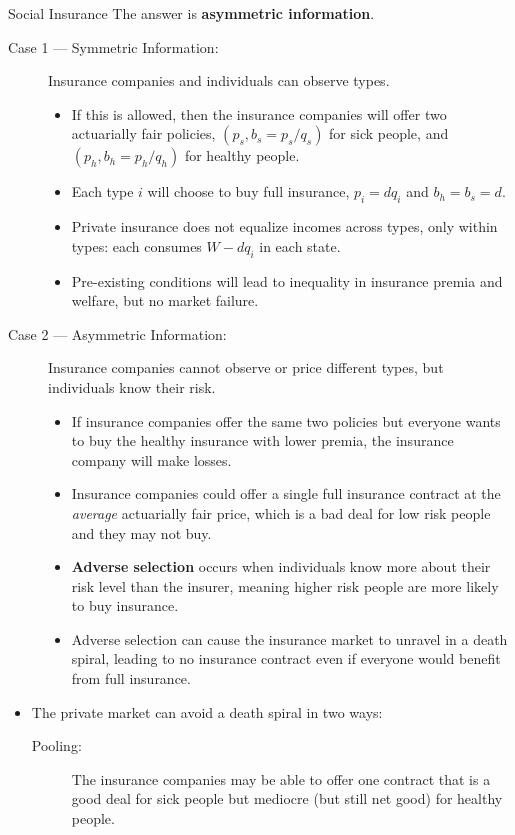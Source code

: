 \documentclass[10pt]{extarticle}
\begin{document}
\begin{problem}{Social Insurance}
    The answer is \textbf{asymmetric information}.
    \begin{description}
      \item[Case 1 --- Symmetric Information:] Insurance companies and individuals can observe types.
        \begin{itemize}
          \item If this is allowed, then the insurance companies will offer two actuarially fair policies, $(p_s, b_s = p_s/q_s)$ for sick people, and $(p_h, b_h = p_h/q_h)$ for healthy people.
          \item Each type $i$ will choose to buy full insurance, $p_i = dq_i$ and $b_h = b_s = d$.
          \item Private insurance does not equalize incomes across types, only within types: each consumes $W - dq_i$ in each state.
          \item Pre-existing conditions will lead to inequality in insurance premia and welfare, but no market failure.
        \end{itemize}
      \item[Case 2 --- Asymmetric Information:] Insurance companies cannot observe or price different types, but individuals know their risk.
        \begin{itemize}
          \item If insurance companies offer the same two policies but everyone wants to buy the healthy insurance with lower premia, the insurance company will make losses.
          \item Insurance companies could offer a single full insurance contract at the \textit{average} actuarially fair price, which is a bad deal for low risk people and they may not buy.
          \item \textbf{Adverse selection} occurs when individuals know more about their risk level than the insurer, meaning higher risk people are more likely to buy insurance.
          \item Adverse selection can cause the insurance market to unravel in a death spiral, leading to no insurance contract even if everyone would benefit from full insurance.
        \end{itemize}
    \end{description}
    \begin{itemize}
      \item The private market can avoid a death spiral in two ways:
        \begin{description}
          \item[Pooling:] The insurance companies may be able to offer one contract that is a good deal for sick people but mediocre (but still net good) for healthy people.

\end{description}
\end{itemize}
\end{problem}
\end{document}
